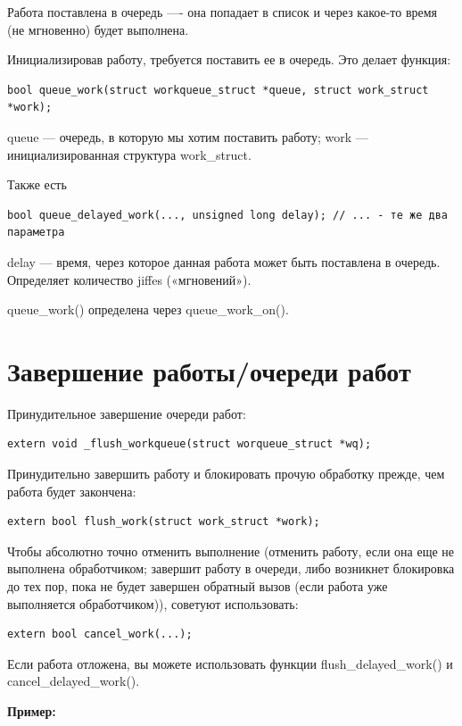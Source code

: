 Работа поставлена в очередь —- она попадает в список и через какое-то время (не мгновенно) будет выполнена.

Инициализировав работу, требуется поставить ее в очередь. Это делает функция:
\begin{lstlisting}
bool queue_work(struct workqueue_struct *queue, struct work_struct *work);
\end{lstlisting}

queue — очередь, в которую мы хотим поставить работу;
work — инициализированная структура work\_struct.

Также есть
\begin{lstlisting}
bool queue_delayed_work(..., unsigned long delay); // ... - те же два параметра
\end{lstlisting}

delay — время, через которое данная работа может быть поставлена в очередь.
Определяет количество jiffes («мгновений»).

queue\_work() определена через queue\_work\_on().

\section{Завершение работы/очереди работ}

Принудительное завершение очереди работ:
\begin{lstlisting}
extern void _flush_workqueue(struct worqueue_struct *wq);
\end{lstlisting}

Принудительно завершить работу и блокировать прочую обработку прежде, чем работа будет закончена:
\begin{lstlisting}
extern bool flush_work(struct work_struct *work);
\end{lstlisting}

Чтобы абсолютно точно отменить выполнение (отменить работу, если она еще не выполнена обработчиком; завершит работу в очереди, либо возникнет блокировка до тех пор, пока не будет завершен обратный вызов (если работа уже выполняется обработчиком)), советуют использовать:
\begin{lstlisting}
extern bool cancel_work(...);
\end{lstlisting}

Если работа отложена, вы можете использовать функции flush\_delayed\_work() и \\ cancel\_delayed\_work().

\textbf{Пример:}


